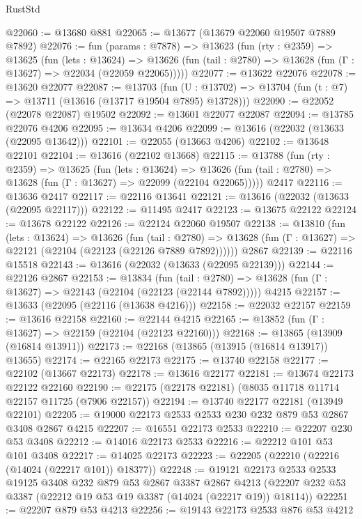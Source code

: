 \begin{lexlean}{RustStd}
\begin{coremodule}
@22060 := @13680 @881
@22065 := @13677 (@13679 @22060 @19507 @7889 @7892)
@22076 := fun (params : @7878) =>
  @13623
    (fun (rty : @2359) =>
    @13625
      (fun (lets : @13624) =>
      @13626 (fun (tail : @2780) => @13628 (fun (Γ : @13627) => @22034 (@22059 @22065)))))
@22077 := @13622 @22076
@22078 := @13620 @22077
@22087 := @13703
    (fun (U : @13702) => @13704 (fun (t : @7) => @13711 (@13616 (@13717 @19504 @7895) @13728)))
@22090 := @22052 (@22078 @22087) @19502
@22092 := @13601 @22077 @22087
@22094 := @13785 @22076 @4206
@22095 := @13634 @4206
@22099 := @13616 (@22032 (@13633 (@22095 @13642)))
@22101 := @22055 (@13663 @4206)
@22102 := @13648 @22101
@22104 := @13616 (@22102 @13668)
@22115 := @13788
    (fun (rty : @2359) =>
    @13625
      (fun (lets : @13624) =>
      @13626 (fun (tail : @2780) => @13628 (fun (Γ : @13627) => @22099 (@22104 @22065)))))
    @2417
@22116 := @13636 @2417
@22117 := @22116 @13641
@22121 := @13616 (@22032 (@13633 (@22095 @22117)))
@22122 := @11495 @2417
@22123 := @13675 @22122
@22124 := @13678 @22122
@22126 := @22124 @22060 @19507
@22138 := @13810
    (fun (lets : @13624) =>
    @13626
      (fun (tail : @2780) =>
      @13628 (fun (Γ : @13627) => @22121 (@22104 (@22123 (@22126 @7889 @7892))))))
    @2867
@22139 := @22116 @15518
@22143 := @13616 (@22032 (@13633 (@22095 @22139)))
@22144 := @22126 @2867
@22153 := @13834
    (fun (tail : @2780) => @13628 (fun (Γ : @13627) => @22143 (@22104 (@22123 (@22144 @7892)))))
    @4215
@22157 := @13633 (@22095 (@22116 (@13638 @4216)))
@22158 := @22032 @22157
@22159 := @13616 @22158
@22160 := @22144 @4215
@22165 := @13852 (fun (Γ : @13627) => @22159 (@22104 (@22123 @22160)))
@22168 := @13865 (@13909 (@16814 @13911))
@22173 := @22168 (@13865 (@13915 (@16814 @13917)) @13655)
@22174 := @22165 @22173
@22175 := @13740 @22158
@22177 := @22102 (@13667 @22173)
@22178 := @13616 @22177
@22181 := @13674 @22173 @22122 @22160
@22190 := @22175 (@22178 @22181) (@8035 @11718 @11714 @22157 @11725 (@7906 @22157))
@22194 := @13740 @22177 @22181 (@13949 @22101)
@22205 := @19000 @22173 @2533 @2533 @230 @232 @879 @53 @2867 @3408 @2867 @4215
@22207 := @16551 @22173 @2533
@22210 := @22207 @230 @53 @3408
@22212 := @14016 @22173 @2533
@22216 := @22212 @101 @53 @101 @3408
@22217 := @14025 @22173
@22223 := @22205 (@22210 (@22216 (@14024 (@22217 @101)) @18377))
@22248 := @19121
    @22173
    @2533
    @2533
    @19125
    @3408
    @232
    @879
    @53
    @2867
    @3387
    @2867
    @4213
    (@22207 @232 @53 @3387 (@22212 @19 @53 @19 @3387 (@14024 (@22217 @19)) @18114))
@22251 := @22207 @879 @53 @4213
@22256 := @19143 @22173 @2533 @876 @53 @4212

\end{coremodule}
\end{lexlean}
